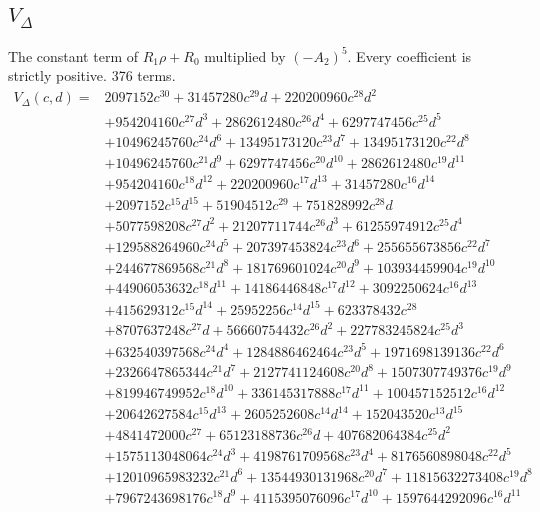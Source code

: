 \subsection*{$V_\Delta$}
The constant term of $R_1\rho+R_0$ multiplied by $(-A_2)^5$. Every coefficient is strictly positive. 376 terms.
{\small
\begin{align*}
V_\Delta(c,d)={}&2097152c^{30}+31457280c^{29}d+220200960c^{28}d^{2}\\
&+954204160c^{27}d^{3}+2862612480c^{26}d^{4}+6297747456c^{25}d^{5}\\
&+10496245760c^{24}d^{6}+13495173120c^{23}d^{7}+13495173120c^{22}d^{8}\\
&+10496245760c^{21}d^{9}+6297747456c^{20}d^{10}+2862612480c^{19}d^{11}\\
&+954204160c^{18}d^{12}+220200960c^{17}d^{13}+31457280c^{16}d^{14}\\
&+2097152c^{15}d^{15}+51904512c^{29}+751828992c^{28}d\\
&+5077598208c^{27}d^{2}+21207711744c^{26}d^{3}+61255974912c^{25}d^{4}\\
&+129588264960c^{24}d^{5}+207397453824c^{23}d^{6}+255655673856c^{22}d^{7}\\
&+244677869568c^{21}d^{8}+181769601024c^{20}d^{9}+103934459904c^{19}d^{10}\\
&+44906053632c^{18}d^{11}+14186446848c^{17}d^{12}+3092250624c^{16}d^{13}\\
&+415629312c^{15}d^{14}+25952256c^{14}d^{15}+623378432c^{28}\\
&+8707637248c^{27}d+56660754432c^{26}d^{2}+227783245824c^{25}d^{3}\\
&+632540397568c^{24}d^{4}+1284886462464c^{23}d^{5}+1971698139136c^{22}d^{6}\\
&+2326647865344c^{21}d^{7}+2127741124608c^{20}d^{8}+1507307749376c^{19}d^{9}\\
&+819946749952c^{18}d^{10}+336145317888c^{17}d^{11}+100457152512c^{16}d^{12}\\
&+20642627584c^{15}d^{13}+2605252608c^{14}d^{14}+152043520c^{13}d^{15}\\
&+4841472000c^{27}+65123188736c^{26}d+407682064384c^{25}d^{2}\\
&+1575113048064c^{24}d^{3}+4198761709568c^{23}d^{4}+8176560898048c^{22}d^{5}\\
&+12010965983232c^{21}d^{6}+13544930131968c^{20}d^{7}+11815632273408c^{19}d^{8}\\
&+7967243698176c^{18}d^{9}+4115395076096c^{17}d^{10}+1597644292096c^{16}d^{11}\\

\end{align*}}
